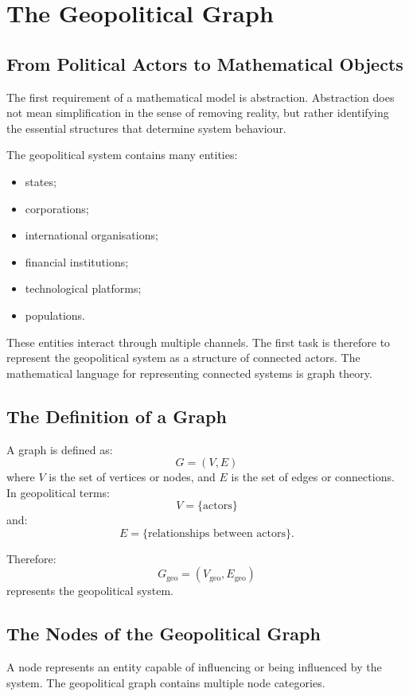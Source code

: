 \documentclass[11pt,openany]{book}
\theoremstyle{plain}
\theoremstyle{definition}
\begin{document}
\chapter{The Geopolitical Graph}

\section*{From Political Actors to Mathematical Objects}

The first requirement of a mathematical model is abstraction. Abstraction does not mean simplification in the sense of removing reality, but rather identifying the essential structures that determine system behaviour.

The geopolitical system contains many entities:
\begin{itemize}
\item states;
\item corporations;
\item international organisations;
\item financial institutions;
\item technological platforms;
\item populations.
\end{itemize}

These entities interact through multiple channels. The first task is therefore to represent the geopolitical system as a structure of connected actors. The mathematical language for representing connected systems is graph theory.

\section*{The Definition of a Graph}

A graph is defined as:
\[
G = (V, E)
\]
where \(V\) is the set of vertices or nodes, and \(E\) is the set of edges or connections. In geopolitical terms:
\[
V = \{\text{actors}\}
\]
and:
\[
E = \{\text{relationships between actors}\}.
\]

Therefore:
\[
\boxed{
G_{\text{geo}} = (V_{\text{geo}}, E_{\text{geo}})
}
\]
represents the geopolitical system.

\section*{The Nodes of the Geopolitical Graph}

A node represents an entity capable of influencing or being influenced by the system. The geopolitical graph contains multiple node categories.
\end{document}
